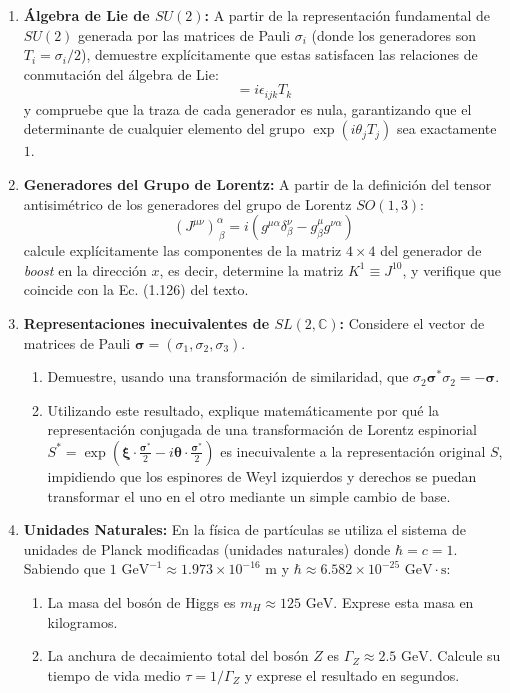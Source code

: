 \begin{enumerate}
    \item \textbf{Álgebra de Lie de $SU(2)$:} 
    A partir de la representación fundamental de $SU(2)$ generada por las matrices de Pauli $\sigma_i$ (donde los generadores son $T_i = \sigma_i/2$), demuestre explícitamente que estas satisfacen las relaciones de conmutación del álgebra de Lie: 
    \begin{equation*}[T_i, T_j] = i\epsilon_{ijk}T_k
    \end{equation*}
    y compruebe que la traza de cada generador es nula, garantizando que el determinante de cualquier elemento del grupo $\exp(i \theta_j T_j)$ sea exactamente $1$.

    \item \textbf{Generadores del Grupo de Lorentz:} 
    A partir de la definición del tensor antisimétrico de los generadores del grupo de Lorentz $SO(1,3)$:
    \begin{equation*}
        (J^{\mu\nu})^\alpha_{\ \beta} = i(g^{\mu\alpha}\delta^\nu_\beta - g^{\mu}_\beta g^{\nu\alpha})
    \end{equation*}
    calcule explícitamente las componentes de la matriz $4 \times 4$ del generador de \textit{boost} en la dirección $x$, es decir, determine la matriz $K^1 \equiv J^{10}$, y verifique que coincide con la Ec. (1.126) del texto.

    \item \textbf{Representaciones inecuivalentes de $SL(2,\mathbb{C})$:} 
    Considere el vector de matrices de Pauli $\boldsymbol{\sigma} = (\sigma_1, \sigma_2, \sigma_3)$. 
    \begin{enumerate}
        \item Demuestre, usando una transformación de similaridad, que $\sigma_2 \boldsymbol{\sigma}^* \sigma_2 = -\boldsymbol{\sigma}$.
        \item Utilizando este resultado, explique matemáticamente por qué la representación conjugada de una transformación de Lorentz espinorial $S^* = \exp \left( \boldsymbol{\xi} \cdot \frac{\boldsymbol{\sigma}^*}{2} - i\boldsymbol{\theta} \cdot \frac{\boldsymbol{\sigma}^*}{2} \right)$ es inecuivalente a la representación original $S$, impidiendo que los espinores de Weyl izquierdos y derechos se puedan transformar el uno en el otro mediante un simple cambio de base.
    \end{enumerate}

    \item \textbf{Unidades Naturales:} 
    En la física de partículas se utiliza el sistema de unidades de Planck modificadas (unidades naturales) donde $\hbar = c = 1$. Sabiendo que $1 \text{ GeV}^{-1} \approx 1.973 \times 10^{-16} \text{ m}$ y $\hbar \approx 6.582 \times 10^{-25} \text{ GeV}\cdot\text{s}$:
    \begin{enumerate}
        \item La masa del bosón de Higgs es $m_H \approx 125 \text{ GeV}$. Exprese esta masa en kilogramos.
        \item La anchura de decaimiento total del bosón $Z$ es $\Gamma_Z \approx 2.5 \text{ GeV}$. Calcule su tiempo de vida medio $\tau = 1/\Gamma_Z$ y exprese el resultado en segundos.
    \end{enumerate}


\end{enumerate}
